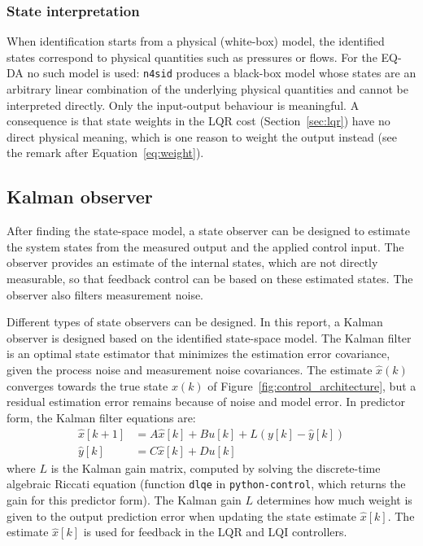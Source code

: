 \documentclass[12pt,a4paper]{article}
\begin{document}
\newpage
\subsubsection{State interpretation}
When identification starts from a physical (white-box) model, the identified states correspond to physical quantities such as pressures or flows. For the EQ-DA no such model is used: \texttt{n4sid} produces a black-box model whose states are an arbitrary linear combination of the underlying physical quantities and cannot be interpreted directly. Only the input-output behaviour is meaningful. A consequence is that state weights in the LQR cost (Section~\ref{sec:lqr}) have no direct physical meaning, which is one reason to weight the output instead (see the remark after Equation~\eqref{eq:weight}).

\newpage
\subsection{Kalman observer}
After finding the state-space model, a state observer can be designed to estimate the system states from the measured output and the applied control input. The observer provides an estimate of the internal states, which are not directly measurable, so that feedback control can be based on these estimated states. The observer also filters measurement noise.

Different types of state observers can be designed. In this report, a Kalman observer is designed based on the identified state-space model. The Kalman filter is an optimal state estimator that minimizes the estimation error covariance, given the process noise and measurement noise covariances. The estimate $\hat{x}(k)$ converges towards the true state $x(k)$ of Figure~\ref{fig:control_architecture}, but a residual estimation error remains because of noise and model error. In predictor form, the Kalman filter equations are:
\begin{equation}
\begin{aligned}
\hat{x}[k+1] &= A \hat{x}[k] + B u[k] + L (y[k] - \hat{y}[k]) \\
\hat{y}[k] &= C \hat{x}[k] + D u[k]
\end{aligned}
\label{eq:kalman}
\end{equation}
where $L$ is the Kalman gain matrix, computed by solving the discrete-time algebraic Riccati equation (function \texttt{dlqe} in \texttt{python-control}, which returns the gain for this predictor form). The Kalman gain $L$ determines how much weight is given to the output prediction error when updating the state estimate $\hat{x}[k]$. The estimate $\hat{x}[k]$ is used for feedback in the LQR and LQI controllers.
\end{document}
